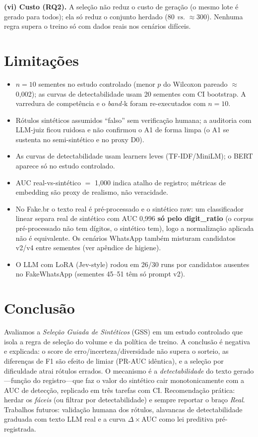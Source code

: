 \documentclass[conference]{IEEEtran}
\begin{document}
\textbf{(vi) Custo (RQ2).} A sele\c{c}\~ao n\~ao reduz o custo de gera\c{c}\~ao (o mesmo lote \'e gerado para todos); ela s\'o reduz o conjunto herdado (80 \emph{vs.} $\approx$300). Nenhuma regra supera o treino s\'o com dados reais nos cen\'arios dif\'iceis.

\section{Limita\c{c}\~oes}

\begin{itemize}
\item $n{=}10$ sementes no estudo controlado (menor $p$ do Wilcoxon pareado $\approx$0{,}002); as curvas de detectabilidade usam 20 sementes com CI bootstrap. A varredura de compet\^encia e o \emph{band-}k foram re-executados com $n{=}10$.
\item R\'otulos sint\'eticos assumidos ``falso'' sem verifica\c{c}\~ao humana; a auditoria com LLM-juiz ficou ruidosa e n\~ao confirmou o A1 de forma limpa (o A1 se sustenta no semi-sint\'etico e no proxy D0).
\item As curvas de detectabilidade usam learners leves (TF-IDF/MiniLM); o BERT aparece s\'o no estudo controlado.
\item AUC real-vs-sint\'etico $=$ 1{,}000 indica atalho de registro; m\'etricas de embedding s\~ao proxy de realismo, n\~ao veracidade.
\item No Fake.br o texto real \'e pr\'e-processado e o sint\'etico raw: um classificador linear separa real de sint\'etico com AUC 0{,}996 \textbf{s\'o pelo digit\_ratio} (o corpus pr\'e-processado n\~ao tem d\'igitos, o sint\'etico tem), logo a normaliza\c{c}\~ao aplicada n\~ao \'e equivalente. Os cen\'arios WhatsApp tamb\'em misturam candidatos v2/v4 entre sementes (ver ap\^endice de higiene).
\item O LLM com LoRA (Jev-style) rodou em 26/30 runs por candidatos ausentes no FakeWhatsApp (sementes 45--51 t\^em s\'o prompt v2).
\end{itemize}

\section{Conclus\~ao}

Avaliamos a \emph{Sele\c{c}\~ao Guiada de Sint\'eticos} (GSS) em um estudo controlado que isola a regra de sele\c{c}\~ao do volume e da pol\'itica de treino. A conclus\~ao \'e negativa e explicada: o score de erro/incerteza/diversidade n\~ao supera o sorteio, as diferen\c{c}as de F1 s\~ao efeito de limiar (PR-AUC id\^entica), e a sele\c{c}\~ao por dificuldade atrai r\'otulos errados. O mecanismo \'e a \emph{detectabilidade} do texto gerado---fun\c{c}\~ao do registro---que faz o valor do sint\'etico cair monotonicamente com a AUC de detec\c{c}\~ao, replicado em tr\^es tarefas com CI. Recomenda\c{c}\~ao pr\'atica: herdar os \emph{f\'aceis} (ou filtrar por detectabilidade) e sempre reportar o bra\c{c}o \emph{Real}. Trabalhos futuros: valida\c{c}\~ao humana dos r\'otulos, alavancas de detectabilidade graduada com texto LLM real e a curva $\Delta\times$AUC como lei preditiva pr\'e-registrada.
\end{document}
